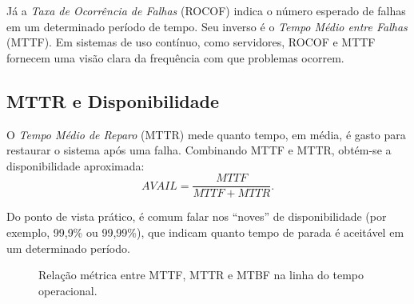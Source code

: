 \documentclass[12pt,a4paper]{report}
\begin{document}
Já a \emph{Taxa de Ocorrência de Falhas} (ROCOF) indica o número esperado de
falhas em um determinado período de tempo. Seu inverso é o \emph{Tempo Médio
entre Falhas} (MTTF). Em sistemas de uso contínuo, como servidores, ROCOF e
MTTF fornecem uma visão clara da frequência com que problemas ocorrem.

\subsection{MTTR e Disponibilidade}

O \emph{Tempo Médio de Reparo} (MTTR) mede quanto tempo, em média, é gasto
para restaurar o sistema após uma falha. Combinando MTTF e MTTR, obtém-se a
disponibilidade aproximada:
\[
AVAIL = \frac{MTTF}{MTTF + MTTR}.
\]

Do ponto de vista prático, é comum falar nos ``noves'' de disponibilidade
(por exemplo, 99{,}9\% ou 99{,}99\%), que indicam quanto tempo de parada é
aceitável em um determinado período.

\begin{figure}[h]
    \centering
    \caption{Relação métrica entre MTTF, MTTR e MTBF na linha do tempo operacional.}
\end{figure}
\end{document}
